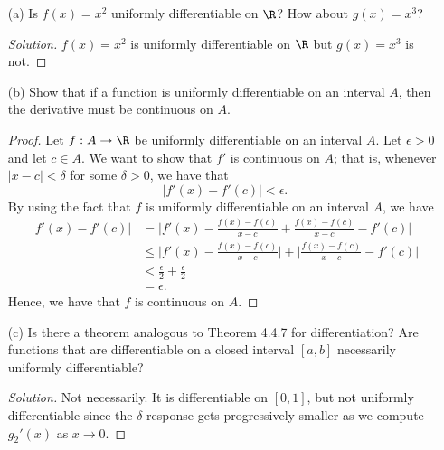 \begin{enumerate}
    \item[(a)] Is \( f(x) = x^2  \) uniformly differentiable on \( \R  \)? How about \( g(x) = x^3 \)?
        \begin{proof}[Solution]
        \( f(x) = x^2  \) is uniformly differentiable on \( \R  \) but \( g(x) =x^3  \) is not.
        \end{proof}
    \item[(b)] Show that if a function is uniformly differentiable on an interval \( A  \), then the derivative must be continuous on \( A  \).
        \begin{proof}
        Let \( f: A \to \R  \) be uniformly differentiable on an interval \( A  \). Let \( \epsilon > 0  \) and let \( c \in A  \). We want to show that \( f'  \) is continuous on \(  A  \); that is, whenever \( |  x - c  | < \delta  \) for some \( \delta > 0  \), we have that 
        \[ | f'(x) - f'(c) | < \epsilon. \]
    By using the fact that \( f  \) is uniformly differentiable on an interval \( A  \), we have 
    \begin{align*}
        | f'(x) - f'(c) | &= \Big| f'(x) - \frac{ f(x) - f(c)  }{ x - c  } + \frac{ f(x) - f(c)  }{ x - c  } - f'(c)  \Big|  \\
                          &\leq \Big| f'(x) - \frac{ f(x) - f(c)  }{ x - c  }  \Big| + \Big| \frac{ f(x) -f(c)  }{ x - c  } - f'(c)  \Big| \\
                          &< \frac{ \epsilon  }{ 2 } + \frac{ \epsilon  }{ 2 } \\
                          &= \epsilon.
    \end{align*}
    Hence, we have that \( f  \) is continuous on \( A  \).
        \end{proof}
    \item[(c)] Is there a theorem analogous to Theorem 4.4.7 for differentiation? Are functions that are differentiable on a closed interval \( [a,b] \) necessarily uniformly differentiable?
        \begin{proof}[Solution]
            Not necessarily. It is differentiable on \( [0,1]  \), but not uniformly differentiable since the \( \delta  \) response gets progressively smaller as we compute \( g_2'(x)  \) as \( x \to 0  \).
        \end{proof}
\end{enumerate}


